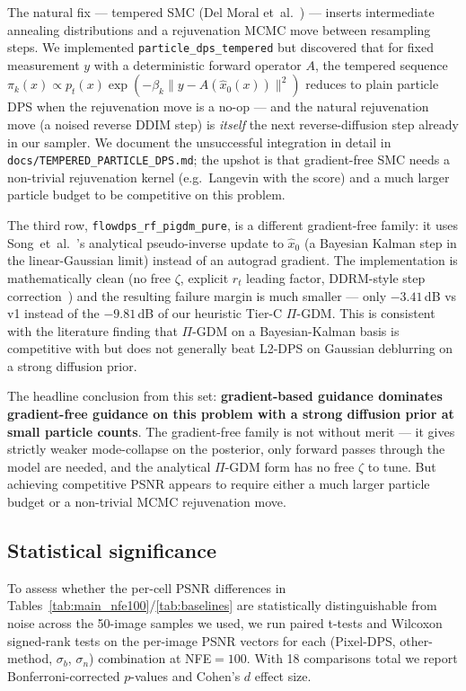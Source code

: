 \documentclass{article}
\begin{document}
The natural fix --- tempered SMC (Del Moral
et~al.~\cite{delmoral2006smc}) --- inserts intermediate annealing
distributions and a rejuvenation MCMC move between resampling
steps. We implemented \texttt{particle\_dps\_tempered} but
discovered that for fixed measurement $y$ with a deterministic
forward operator $A$, the tempered sequence
$\pi_k(x) \propto p_t(x) \exp(-\beta_k \|y - A(\hat x_0(x))\|^2)$
reduces to plain particle DPS when the rejuvenation move is a
no-op --- and the natural rejuvenation move (a noised reverse
DDIM step) is \emph{itself} the next reverse-diffusion step
already in our sampler. We document the unsuccessful integration
in detail in \texttt{docs/TEMPERED\_PARTICLE\_DPS.md}; the upshot
is that gradient-free SMC needs a non-trivial rejuvenation kernel
(e.g.\ Langevin with the score) and a much larger particle budget
to be competitive on this problem.

The third row, \texttt{flowdps\_rf\_pigdm\_pure}, is a different
gradient-free family: it uses Song~et~al.~\cite{song2023pigdm}'s
analytical pseudo-inverse update to $\hat x_0$ (a Bayesian Kalman
step in the linear-Gaussian limit) instead of an autograd gradient.
The implementation is mathematically clean (no free $\zeta$,
explicit $r_t$ leading factor, DDRM-style step
correction~\cite{kawar2022ddrm}) and the resulting failure margin
is much smaller --- only $-3.41$\,dB vs v1 instead of the
$-9.81$\,dB of our heuristic Tier-C $\Pi$-GDM. This is consistent
with the literature finding that $\Pi$-GDM on a Bayesian-Kalman
basis is competitive with but does not generally beat L2-DPS on
Gaussian deblurring on a strong diffusion prior.

The headline conclusion from this set: \textbf{gradient-based
guidance dominates gradient-free guidance on this problem with a
strong diffusion prior at small particle counts}. The
gradient-free family is not without merit --- it gives strictly
weaker mode-collapse on the posterior, only forward passes through
the model are needed, and the analytical $\Pi$-GDM form has no free
$\zeta$ to tune. But achieving competitive PSNR appears to require
either a much larger particle budget or a non-trivial MCMC
rejuvenation move.

\subsection{Statistical significance}\label{sec:significance}

To assess whether the per-cell PSNR differences in
Tables~\ref{tab:main_nfe100}/\ref{tab:baselines} are statistically
distinguishable from noise across the 50-image samples we used, we
run paired t-tests and Wilcoxon signed-rank tests on the per-image
PSNR vectors for each (Pixel-DPS, other-method, $\sigma_b$, $\sigma_n$)
combination at NFE${=}100$. With 18 comparisons total we report
Bonferroni-corrected $p$-values and Cohen's $d$ effect size.
\end{document}
